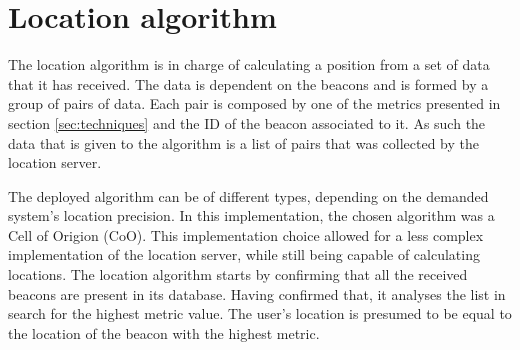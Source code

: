 \section{Location algorithm} 
\label{sec:algos} 
 
 
The location algorithm is in charge of calculating a position from a set of data that it has received. The data is dependent on the beacons and is formed by a group of pairs of data. Each pair is composed by one of the metrics presented in section \ref{sec:techniques} and the ID of the beacon associated to it. As such the data that is given to the algorithm is a list of pairs that was collected by the location server. 
 
 
The deployed algorithm can be of different types, depending on the demanded system's location precision. In this implementation, the chosen algorithm was a Cell of Origion (CoO). This implementation choice allowed for a less complex implementation of the location server, while still being capable of calculating locations. The location algorithm starts by confirming that all the received beacons are present in its database. Having confirmed that, it analyses the list in search for the highest metric value. The user's location is presumed to be equal to the location of the beacon with the highest metric. 
 